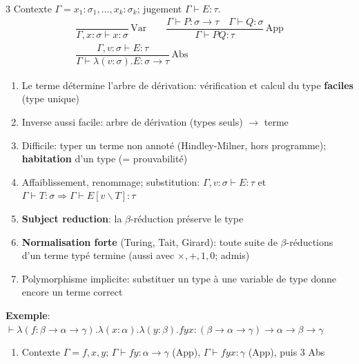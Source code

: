 \documentclass[12pt, a4paper]{article}
\newcommand{\vd}{\vdash}
\newcommand{\rul}[3]{\dfrac{#1}{#2}\,{\scriptstyle #3}}
\begin{document}
\begin{multicols*}{3}
	Contexte $\Gamma=x_1:\sigma_1,\dots,x_k:\sigma_k$; jugement $\Gamma\vd E:\tau$.
	\begin{gather*}
		\rul{}{\Gamma,x:\sigma\vd x:\sigma}{\text{Var}}\qquad
		\rul{\Gamma\vd P:\sigma\to\tau\quad\Gamma\vd Q:\sigma}{\Gamma\vd PQ:\tau}{\text{App}}\\
		\rul{\Gamma,v:\sigma\vd E:\tau}{\Gamma\vd\lambda(v:\sigma).E:\sigma\to\tau}{\text{Abs}}
	\end{gather*}
	\begin{enumerate}[\roman*.]
		\item Le terme détermine l'arbre de dérivation: vérification et calcul du type \textbf{faciles} (type unique)
		\item Inverse aussi facile: arbre de dérivation (types seuls) $\to$ terme
		\item Difficile: typer un terme non annoté (Hindley-Milner, hors programme); \textbf{habitation} d'un type (= prouvabilité)
		\item Affaiblissement, renommage; substitution: $\Gamma,v:\sigma\vd E:\tau$ et $\Gamma\vd T:\sigma\Rightarrow\Gamma\vd E[v\backslash T]:\tau$
		\item \textbf{Subject reduction}: la $\beta$-réduction préserve le type
		\item \textbf{Normalisation forte} (Turing, Tait, Girard): toute suite de $\beta$-réductions d'un terme typé termine (aussi avec $\times,+,1,0$; admis)
		\item Polymorphisme implicite: substituer un type à une variable de type donne encore un terme correct
	\end{enumerate}
	\textbf{Exemple}: $\vd\lambda(f:\beta\to\alpha\to\gamma).\lambda(x:\alpha).\lambda(y:\beta).fyx:(\beta\to\alpha\to\gamma)\to\alpha\to\beta\to\gamma$
	\begin{enumerate}[\roman*.]
		\item Contexte $\Gamma=f,x,y$; $\Gamma\vd fy:\alpha\to\gamma$ (App), $\Gamma\vd fyx:\gamma$ (App), puis 3 Abs
	\end{enumerate}

	\colbreak

\end{multicols*}
\end{document}

